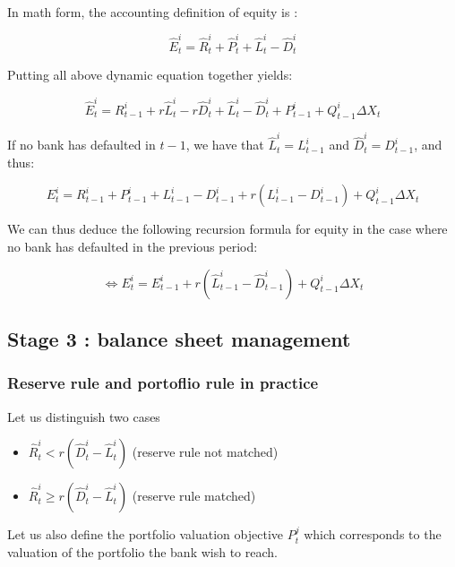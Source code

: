 \documentclass{article}
\newcommand{\wh}{\widehat}
\begin{document}
\paragraph{}
In math form, the accounting definition of equity is : 

\begin{equation}\label{eq:eqtdef}
\wh E^i_t = \wh R^i_t + \wh P_t^i + \wh L^i_t - \wh D^i_t
\end{equation}

Putting all above dynamic equation together yields: 

$$ \wh E^i_t = R_{t-1}^i + r \wh L_t^i - r \wh D_t^i + \wh L^i_t - \wh D^i_t + P_{t-1}^i + Q_{t-1}^i\Delta X_t$$

If no bank has defaulted in $t-1$, we have that $\wh L^i_t = L^i_{t-1}$ and $ \wh D^i_t = D^i_{t-1}$, and thus:

$$E^i_t = R_{t-1}^i + P_{t-1}^{i} + L^i_{t-1} - D^i_{t-1} + r (L_{t-1}^i - D_{t-1}^i) + Q_{t-1}^i\Delta X_t$$

We can thus deduce the following recursion formula for equity in the case where no bank has defaulted in the previous period: 

\begin{equation}\label{eq:eqtdyna}
\Leftrightarrow E^i_t = E^i_{t-1} + r (\wh L_{t-1}^i - \wh D_{t-1}^i) + Q_{t-1}^i\Delta X_t
\end{equation}

\subsection{Stage 3 : balance sheet management}\label{balance_sheet_management}

\subsubsection{Reserve rule and portoflio rule in practice}

Let us distinguish two cases

\begin{itemize}
    \item $\widehat{R}_t^i < r(\wh D_t^i - \wh L_t^i)$ (reserve rule not matched)
    \item $\widehat{R}_t^i \geq r(\wh D_t^i - \wh L_t^i)$ (reserve rule matched)
\end{itemize}

Let us also define the portfolio valuation objective $P_t^{j}$ which corresponds to the valuation of the portfolio the bank wish to reach.
\end{document}
